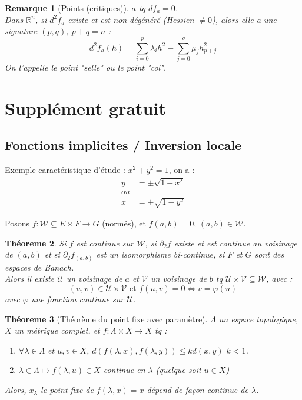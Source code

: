 \documentclass[a4paper, oneside]{report}
\theoremstyle{break}
\newtheorem{thm}{Théoreme}[section] %
\newtheorem{remar}[thm]{Remarque}
\newcommand{\x}{\times}
\newcommand{\R}{\mathbb{R}}
\begin{document}
\begin{remar}[Points (critiques)]
$a$ tq $df_a = 0$.\\
Dans $\R^n$, si $d^2f_a$ existe et est non dégénéré (Hessien $\neq 0$), alors elle a une signature $(p,q)$, $p+q=n$ :
$$d^2f_a(h) = \sum_{i=0}^p\lambda_i h^2 - \sum_{j=0}^q \mu_j h_{p+j}^2$$
On l'appelle le point "selle" ou le point "col".
\end{remar}

\section{Supplément gratuit}

\subsection{Fonctions implicites / Inversion locale}

Exemple caractéristique d'étude : $x^2+ y^2 = 1$, on a :
\begin{align*}
y&= \pm \sqrt{1-x^2}\\
ou\\
x&=\pm \sqrt{1-y^2}
\end{align*}

Posons $f : \mathcal{W}\subseteq E\x F \rightarrow G$ (normés), et $f(a,b)=0$, $(a,b)\in \mathcal{W}$.

\begin{thm}
Si $f$ est continue sur $\mathcal{W}$, si $\partial_2 f$ existe et est continue au voisinage de $(a,b)$ et si $\partial_2 f_{(a,b)}$ est un isomorphisme bi-continue, si $F$ et $G$ sont des espaces de Banach.\\
Alors il existe $\mathcal{U}$ un voisinage de $a$ et $\mathcal{V}$ un voisinage de $b$ tq $\mathcal{U}\x \mathcal{V} \subseteq \mathcal{W}$, avec :
$$(u,v)\in \mathcal{U}\x \mathcal{V}\text{ et } f(u,v)=0 \Leftrightarrow v=\varphi(u)$$
avec $\varphi$ une fonction continue sur $\mathcal{U}$.
\end{thm}

\begin{thm}[Théorème du point fixe avec paramètre]
$\Lambda$ un espace topologique, $X$ un métrique complet, et $f:\Lambda \x X \rightarrow X$ tq :
\begin{enumerate}
\item $\forall \lambda \in \Lambda$ et $u,v \in X$, $d(f(\lambda, x),f(\lambda, y))\leq k d(x,y)$ $k<1$.
\item $\lambda \in \Lambda \mapsto f(\lambda, u) \in X$ continue en $\lambda$ (quelque soit $u\in X$)
\end{enumerate}
Alors, $x_\lambda$ le point fixe de $f(\lambda, x) = x$ dépend de façon continue de $\lambda$.
\end{thm}
\end{document}
